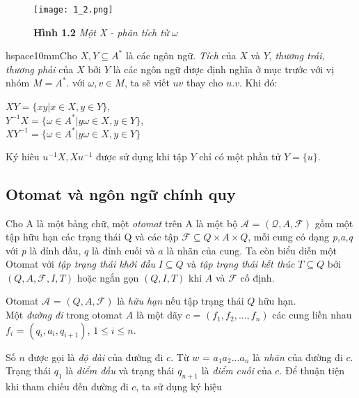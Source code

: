 \begin{figure}[ht]
\texttt{[image: 1\_2.png]}
\caption{\textbf{Hình 1.2} \textit{Một X - phân tích từ} $\omega$}
\end{figure}
\begin{flushleft}
hspace{10mm}Cho $X, Y \subseteq A^*$ là các ngôn ngữ. \textit{Tích} của $X$ và $Y$, \textit{thương trái, thương phải} của $X$ bởi $Y$ là các ngôn ngữ được định nghĩa ở mục trước với vị nhóm $M = A^*$. với $\omega, v \in M$, ta sẽ viết $uv$ thay cho $u.v$. Khi đó:
\end{flushleft}
$XY = \{ xy|x \in X , y \in Y\}$,\\
$Y^{-1}X = \{ \omega \in A^* | y\omega \in X , y \in Y\}$,\\
$XY^{-1} = \{ \omega \in A^* | y\omega \in X , y \in Y\}$
\begin{flushleft}
Ký hiêu $u^{-1}X, Xu^{-1}$ được sử dụng khi tập $Y$ chỉ có một phần tử $Y = \{ u \}$.
\end{flushleft}
\begin{flushleft}
\section{Otomat và ngôn ngữ chính quy}
Cho A là một bảng chữ, một \textit{otomat} trên A là một bộ $\mathcal{A}$ = $(\mathcal{Q},A, \mathcal{F})$ gồm một tập hữu hạn các trạng thái Q và các tập $\mathcal{F} \subseteq Q \times A \times Q$, mỗi cung có dạng \textit{p,a,q} với \textit{p} là đỉnh đầu, $q$ là đỉnh cuối và $a$ là nhãn của cung. Ta còn biểu diễn một Otomat với \textit{tập trạng thái khởi đầu} $I \subseteq Q$ và \textit{tập trạng thái kết thúc} $T \subseteq Q$ bởi $( Q, A, \mathcal{F}, I, T )$ hoặc ngắn gọn $(Q, I, T)$ khi $A$ và $\mathcal{F}$ cố định.
\end{flushleft}
\hspace{10mm}Otomat $\mathcal{A}$ = $(Q, A, \mathcal{F})$ là \textit{hữu hạn} nếu tập trạng thái $Q$ hữu hạn.\\
\hspace{10mm}Một \textit{đường đi} trong otomat $A$ là một dãy $c$ = $(f_1, f_2, ... ,f_n)$ các cung liền nhau \\
$f_i$ = $(q_i, a_i, q_{i+1})$,  $1 \le i \le n.$
\begin{flushleft}
    \hspace{10mm}Số $n$ được gọi là \textit{độ dài} của đường đi $c$. Từ $w$ = $a_1a_2...a_n$ là \textit{nhãn} của đường đi $c$. Trạng thái $q_1$ là \textit{điểm đầu} và trạng thái $q_{n+1}$ là \textit{điểm cuối} của $c$. Để thuận tiện khi tham chiếu đến đường đi $c$, ta sử dụng ký hiệu
\end{flushleft}
